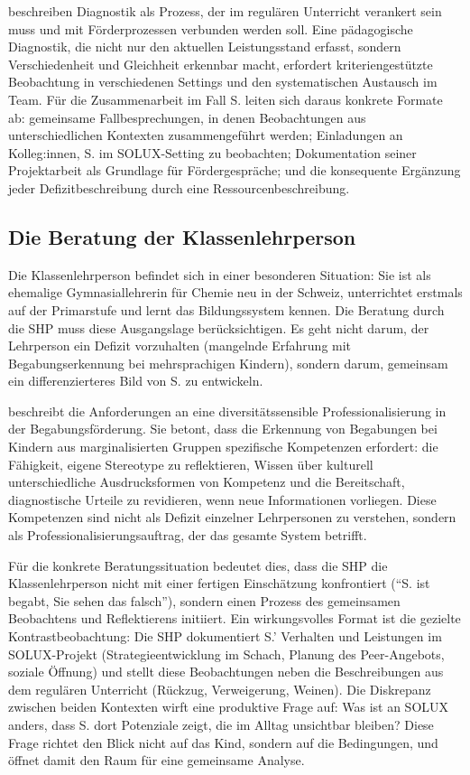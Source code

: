 \documentclass[ngerman, a4paper]{article}
\begin{document}
\textcite{buholzer2010allegleich} beschreiben Diagnostik als Prozess, der im regulären
Unterricht verankert sein muss und mit Förderprozessen verbunden werden soll.
Eine pädagogische Diagnostik, die nicht nur den aktuellen Leistungsstand erfasst,
sondern Verschiedenheit und Gleichheit erkennbar macht, erfordert kriteriengestützte
Beobachtung in verschiedenen Settings und den systematischen Austausch im Team.
Für die Zusammenarbeit im Fall S. leiten sich daraus konkrete Formate ab:
gemeinsame Fallbesprechungen, in denen Beobachtungen aus unterschiedlichen
Kontexten zusammengeführt werden; Einladungen an Kolleg:innen, S. im SOLUX-Setting
zu beobachten; Dokumentation seiner Projektarbeit als Grundlage für Fördergespräche;
und die konsequente Ergänzung jeder Defizitbeschreibung durch eine Ressourcenbeschreibung.

\subsection{Die Beratung der Klassenlehrperson}

Die Klassenlehrperson befindet sich in einer besonderen Situation: Sie ist als
ehemalige Gymnasiallehrerin für Chemie neu in der Schweiz, unterrichtet erstmals
auf der Primarstufe und lernt das Bildungssystem kennen. Die Beratung durch die SHP
muss diese Ausgangslage berücksichtigen. Es geht nicht darum, der Lehrperson ein
Defizit vorzuhalten (mangelnde Erfahrung mit Begabungserkennung bei mehrsprachigen
Kindern), sondern darum, gemeinsam ein differenzierteres Bild von S. zu entwickeln.

\textcite[S.\,161,\,163\psq]{macha2019gender} beschreibt die Anforderungen an eine diversitätssensible Professionalisierung
in der Begabungsförderung. Sie betont, dass die Erkennung von Begabungen bei Kindern
aus marginalisierten Gruppen spezifische Kompetenzen erfordert: die Fähigkeit, eigene
Stereotype zu reflektieren, Wissen über kulturell unterschiedliche Ausdrucksformen
von Kompetenz und die Bereitschaft, diagnostische Urteile zu revidieren, wenn neue
Informationen vorliegen. Diese Kompetenzen sind nicht als Defizit einzelner
Lehrpersonen zu verstehen, sondern als Professionalisierungsauftrag, der das
gesamte System betrifft.

Für die konkrete Beratungssituation bedeutet dies, dass die SHP die
Klassenlehrperson nicht mit einer fertigen Einschätzung konfrontiert
(\enquote{S. ist begabt, Sie sehen das falsch}), sondern einen Prozess des
gemeinsamen Beobachtens und Reflektierens initiiert. Ein wirkungsvolles Format
ist die gezielte Kontrastbeobachtung: Die SHP dokumentiert S.' Verhalten und
Leistungen im SOLUX-Projekt (Strategieentwicklung im Schach, Planung des
Peer-Angebots, soziale Öffnung) und stellt diese Beobachtungen neben die
Beschreibungen aus dem regulären Unterricht (Rückzug, Verweigerung, Weinen). Die
Diskrepanz zwischen beiden Kontexten wirft eine produktive Frage auf: Was ist
an SOLUX anders, dass S. dort Potenziale zeigt, die im Alltag unsichtbar bleiben?
Diese Frage richtet den Blick nicht auf das Kind, sondern auf die Bedingungen,
und öffnet damit den Raum für eine gemeinsame Analyse.
\end{document}
